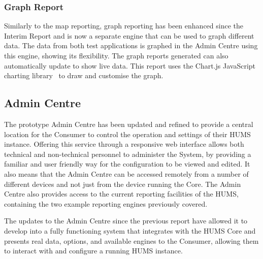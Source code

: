 \documentclass[10pt,a4paper]{article}
\begin{document}
\subsubsection{Graph Report}
Similarly to the map reporting, graph reporting has been enhanced since the Interim Report and is now a separate engine that can be used to graph different data. The data from both test applications is graphed in the Admin Centre using this engine, showing its flexibility. The graph reports generated can also automatically update to show live data. This report uses the Chart.js JavaScript charting library~\cite{chart_js} to draw and customise the graph.

\subsection{Admin Centre}
\label{sec:admin}

The prototype Admin Centre has been updated and refined to provide a central location for the Consumer to control the operation and settings of their HUMS instance. Offering this service through a responsive web interface allows both technical and non-technical personnel to administer the System, by providing a familiar and user friendly way for the configuration to be viewed and edited. It also means that the Admin Centre can be accessed remotely from a number of different devices and not just from the device running the Core.
The Admin Centre also provides access to the current reporting facilities of the HUMS, containing the two example reporting engines previously covered. 

The updates to the Admin Centre since the previous report have allowed it to develop into a fully functioning system that integrates with the HUMS Core and presents real data, options, and available engines to the Consumer, allowing them to interact with and configure a running HUMS instance.
\end{document}
